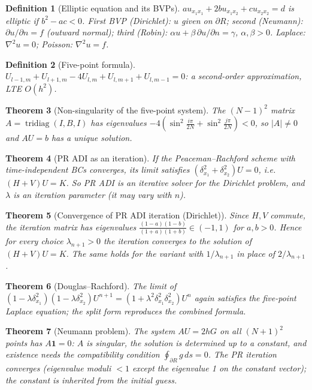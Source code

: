 \documentclass[10pt,a4paper]{article}
\theoremstyle{tight}
\newtheorem{theorem}{Theorem}[section]
\newtheorem{definition}[theorem]{Definition}
\begin{document}
\begin{definition}[Elliptic equation and its BVPs]
\(au_{x_1x_1}+2bu_{x_1x_2}+cu_{x_2x_2}=d\) is elliptic if \(b^2-ac<0\). First BVP (Dirichlet):
\(u\) given on \(\partial R\); second (Neumann): \(\partial u/\partial n=f\) (outward normal); third
(Robin): \(\alpha u+\beta\,\partial u/\partial n=\gamma\), \(\alpha,\beta>0\).
Laplace: \(\nabla^2u=0\); Poisson: \(\nabla^2u=f\).
\end{definition}

\begin{definition}[Five-point formula]
\(U_{l-1,m}+U_{l+1,m}-4U_{l,m}+U_{l,m+1}+U_{l,m-1}=0\): a second-order approximation, LTE \(O(h^2)\).
\end{definition}

\begin{theorem}[Non-singularity of the five-point system]
The \((N-1)^2\) matrix \(A=\operatorname{tridiag}(I,B,I)\) has eigenvalues
\(-4(\sin^2\frac{i\pi}{2N}+\sin^2\frac{j\pi}{2N})<0\), so \(|A|\ne0\) and \(AU=b\) has a unique solution.
\end{theorem}

\begin{theorem}[PR ADI as an iteration]
If the Peaceman--Rachford scheme with time-independent BCs converges, its limit satisfies
\((\delta_{x_1}^2+\delta_{x_2}^2)U=0\), i.e.\ \((H+V)U=K\). So PR ADI is an iterative solver for the
Dirichlet problem, and \(\lambda\) is an iteration parameter (it may vary with \(n\)).
\end{theorem}

\begin{theorem}[Convergence of PR ADI iteration (Dirichlet)]
Since \(H,V\) commute, the iteration matrix has eigenvalues \(\frac{(1-a)(1-b)}{(1+a)(1+b)}\in(-1,1)\)
for \(a,b>0\). Hence for every choice \(\lambda_{n+1}>0\) the iteration converges to the solution of
\((H+V)U=K\). The same holds for the variant with \(1/\lambda_{n+1}\) in place of \(2/\lambda_{n+1}\).
\end{theorem}

\begin{theorem}[Douglas--Rachford]
The limit of \((1-\lambda\delta_{x_1}^2)(1-\lambda\delta_{x_2}^2)U^{n+1}=(1+\lambda^2\delta_{x_1}^2\delta_{x_2}^2)U^n\)
again satisfies the five-point Laplace equation; the split form reproduces the combined formula.
\end{theorem}

\begin{theorem}[Neumann problem]
The system \(AU=2hG\) on all \((N+1)^2\) points has \(A\mathbf1=0\): \(A\) is singular, the solution is
determined up to a constant, and existence needs the compatibility condition \(\oint_{\partial R}g\,ds=0\).
The PR iteration converges (eigenvalue moduli \(<1\) except the eigenvalue 1 on the constant vector);
the constant is inherited from the initial guess.
\end{theorem}
\end{document}
